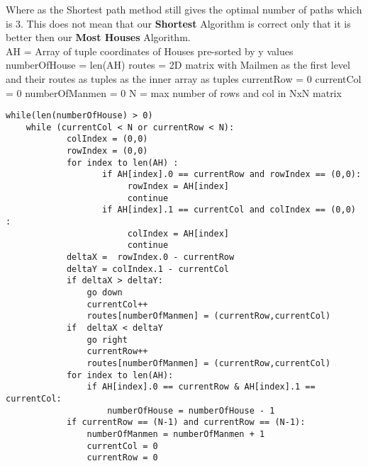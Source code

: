 \documentclass[11pt]{article}
\begin{document}
\hfill \break
\break
Where as the Shortest path method still gives the optimal number of paths which is 3. This does not mean that our  \textbf{Shortest} Algorithm is correct only that it is better then our \textbf{Most Houses} Algorithm.
\hfill \break
\break
\\
\newpage
\hfill \break
\break
AH = Array of tuple coordinates of Houses pre-sorted by y values
\newline
numberOfHouse = len(AH)
\newline
routes =  2D matrix with Mailmen as the first level and their routes as tuples as the inner array as tuples
\newline
currentRow = 0
\newline
currentCol = 0
\newline
numberOfManmen = 0
\newline
N =  max number of rows and col in NxN matrix
\begin{lstlisting}
while(len(numberOfHouse) > 0)
    while (currentCol < N or currentRow < N):
            colIndex = (0,0)
            rowIndex = (0,0)
            for index to len(AH) :
                   if AH[index].0 == currentRow and rowIndex == (0,0):
                        rowIndex = AH[index]
                        continue
                   if AH[index].1 == currentCol and colIndex == (0,0) :
                        colIndex = AH[index]
                        continue
            deltaX =  rowIndex.0 - currentRow
            deltaY = colIndex.1 - currentCol
            if deltaX > deltaY:
                go down
                currentCol++
                routes[numberOfManmen] = (currentRow,currentCol)
            if  deltaX < deltaY
                go right
                currentRow++
                routes[numberOfManmen] = (currentRow,currentCol)
            for index to len(AH):
                if AH[index].0 == currentRow & AH[index].1 == currentCol:
                    numberOfHouse = numberOfHouse - 1
            if currentRow == (N-1) and currentRow == (N-1):
                numberOfManmen = numberOfManmen + 1
                currentCol = 0
                currentRow = 0
                
            



        
        
           
            
            
                
                
    
\end{lstlisting}
\end{document}
